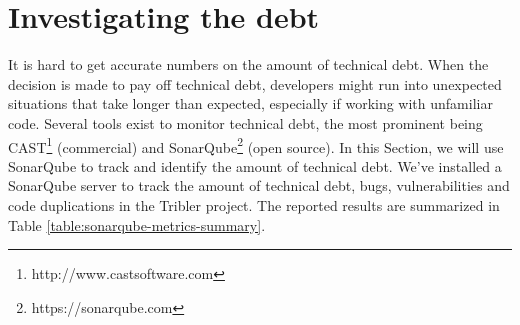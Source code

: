 
\section{Investigating the debt}
It is hard to get accurate numbers on the amount of technical debt. When the decision is made to pay off technical debt, developers might run into unexpected situations that take longer than expected, especially if working with unfamiliar code. Several tools exist to monitor technical debt, the most prominent being CAST\footnote{http://www.castsoftware.com} (commercial) and SonarQube\footnote{https://sonarqube.com}\cite{falessi2015towards} (open source). In this Section, we will use SonarQube to track and identify the amount of technical debt. We've installed a SonarQube server to track the amount of technical debt, bugs, vulnerabilities and code duplications in the Tribler project. The reported results are summarized in Table \ref{table:sonarqube-metrics-summary}.\\

